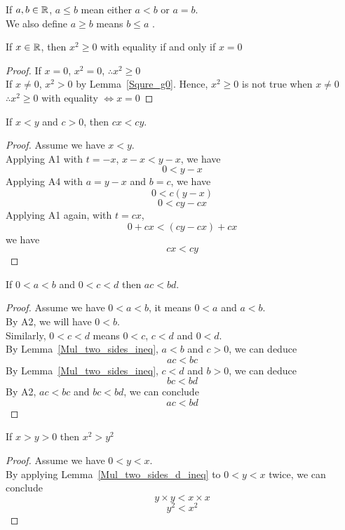 \documentclass[a4paper]{article}
\begin{document}
\begin{defi}[$\leq$]
If $a, b \in \mathbb{R}$, $a \leq b$ mean either $a < b$ or $a = b$.\\
We also define $a \geq b$ means $b \leq a$ .
\end{defi}

\begin{ncor}
If $x \in \mathbb{R}$, then $x^2 \geq 0$ with equality if and only if $x = 0$
\end{ncor}
\begin{proof}
If $x = 0$, $x^2 = 0$, $\therefore x^2 \geq 0$\\
If $x \neq 0$, $x^2 > 0$ by Lemma~\ref{Squre_g0}. Hence, $x^2 \geq 0$ is not true when $x \neq 0$\\
$\therefore x^2 \geq 0$ with equality $\iff x = 0$
\end{proof}

\begin{nlemma}\label{Mul_two_sides_ineq}
If $x < y$ and $c > 0$, then $cx < cy$.
\end{nlemma}
\begin{proof}
Assume we have $x < y$.\\
Applying A1 with $t = -x$, $x - x < y - x$, we have $$ 0 < y - x$$
Applying A4 with $a = y - x$ and $b = c$, we have$$ 0 < c(y-x)$$
$$0 < cy - cx$$
Applying A1 again, with $t = cx$, $$0 + cx < (cy - cx) + cx$$we have $$cx < cy$$
\end{proof}

\begin{nlemma}\label{Mul_two_sides_d_ineq}
If $0 < a < b$ and $0 < c < d$ then $ac < bd$.
\end{nlemma}
\begin{proof}
Assume we have $0 < a < b$, it means $0 < a$ and $a < b$.\\
By A2, we will have $0 < b$.\\
Similarly, $0 < c < d$ means $0 < c$, $c < d$ and $0 < d$.\\
By Lemma~\ref{Mul_two_sides_ineq}, $a < b$ and $c > 0$, we can deduce$$ac < bc$$
By Lemma~\ref{Mul_two_sides_ineq}, $c < d$ and $b > 0$, we can deduce$$bc < bd$$
By A2, $ac < bc$ and $bc < bd$, we can conclude$$ac < bd$$
\end{proof}

\begin{ncor}\label{Square_keeps_ineq}
If $x > y > 0$ then $x^2 > y^2$
\end{ncor}
\begin{proof}
Assume we have $0 < y < x$.\\
By applying Lemma~\ref{Mul_two_sides_d_ineq} to $0 < y < x$ twice, we can conclude
$$y \times y < x \times x$$
$$y^2 < x^2$$
\end{proof}
\end{document}
